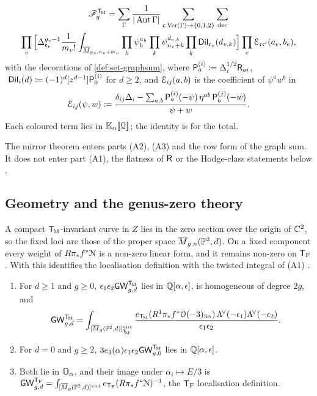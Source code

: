 \begin{thm}
\begin{multline}
\mathscr{F}_g^{\mathsf{T}_{\!\mathrm{M}}}
=\sum_{\Gamma}\frac{1}{|\operatorname{Aut}\Gamma|}\sum_{\mathfrak{c}:\mathrm{Ver}(\Gamma)\to\{0,1,2\}}\sum_{\mathrm{dec}}\\
\prod_{v}\Big[\Delta_{\mathfrak{c}_v}^{g_v-1}\frac{1}{m_v!}\int_{\overline{M}_{g_v,n_v+m_v}}\prod_h\psi_h^{a_h}\prod_k\psi_{n_v+k}^{d_{v,k}}\prod_k\mathsf{Dil}_{\mathfrak{c}_v}(d_{v,k})\Big]
\prod_{e}\mathcal{E}_{\mathfrak{c}\mathfrak{c}'}(a_e,b_e),
\label{eq:gen-graphsum}
\end{multline}
with the decorations of \cref{def:set-graphsum}, where $\mathsf{P}_a^{(i)}\coloneqq\Delta_i^{1/2}\mathsf{R}_{ai}$, $\ \Dil_i(d)\coloneqq(-1)^d[z^{d-1}]\Pn_0^{(i)}$ for $d\geq2$, and $\mathcal{E}_{ij}(a,b)$ is the coefficient of $\psi^aw^b$ in
\[
\mathcal{E}_{ij}(\psi,w)\coloneqq\frac{\delta_{ij}\Delta_i-\sum_{a,b}\mathsf{P}_a^{(i)}(-\psi)\,\eta^{ab}\,\mathsf{P}_b^{(j)}(-w)}{\psi+w}.
\]
Each coloured term lies in $\mathbb{K}_{\alpha}[\![ \mathcal{Q} ]\!]$; the identity is for the total.
\end{thm}

The mirror theorem enters parts (A2), (A3) and the row form of the graph sum. It does not enter part (A1), the flatness of $\mathsf{R}$ or the Hodge-class statements below .

\subsection{Geometry and the genus-zero theory}

A compact $\mathsf{T}_{\!\mathrm{M}}$-invariant curve in $Z$ lies in the zero section over the origin of $\mathbb{C}^2$, so the fixed loci are those of the proper space $\overline{M}_{g,n}(\mathbb{P}^2,d)$. On a fixed component every weight of $R\pi_*f^*\mathcal{N}$ is a non-zero linear form, and it remains non-zero on $\mathsf{T}_{\mathrm{F}}$. With \cite{GP99} this identifies the localisation definition with the twisted integral of \textup{(A1)} .

\begin{prop}
\label{prop:gen-poly}
\begin{enumerate}
\item For $d\geq1$ and $g\geq0$, $\epsilon_1\epsilon_2\mathsf{GW}_{g,d}^{\mathsf{T}_{\!\mathrm{M}}}$ lies in $\mathbb{Q}[\alpha,\epsilon]$, is homogeneous of degree $2g$, and
\[
\mathsf{GW}_{g,d}^{\mathsf{T}_{\!\mathrm{M}}}=\int_{[\overline{M}_g(\mathbb{P}^2,d)]^{\mathrm{virt}}_{\mathsf{T}_{\!\mathrm{M}}}}\frac{e_{\mathsf{T}_{\!\mathrm{M}}}(R^1\pi_*f^*\mathcal{O}(-3)_{3\alpha})\,\Lambda^{\!\vee}(-\epsilon_1)\Lambda^{\!\vee}(-\epsilon_2)}{\epsilon_1\epsilon_2}.
\]
\item For $d=0$ and $g\geq2$, $3e_3(\alpha)\epsilon_1\epsilon_2\mathsf{GW}_{g,0}^{\mathsf{T}_{\!\mathrm{M}}}$ lies in $\mathbb{Q}[\alpha,\epsilon]$.
\item Both lie in $\mathbb{O}_{\alpha}$, and their image under $\alpha_i\mapsto E/3$ is $\mathsf{GW}_{g,d}^{\mathsf{T}_{\mathrm{F}}}=\int_{[\overline{M}_g(\mathbb{P}^2,d)]^{\mathrm{virt}}}e_{\mathsf{T}_{\mathrm{F}}}(R\pi_*f^*\mathcal{N})^{-1}$, the $\mathsf{T}_{\mathrm{F}}$ localisation definition.
\end{enumerate}
\end{prop}

